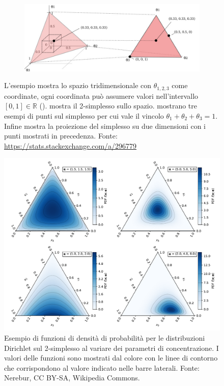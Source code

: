 \begin{figure}
    \begin{subfigure}{.9\textwidth}
        \centering
        \includegraphics[width=\linewidth]{assets/4/simplex_5.png}
        \caption{}
        \label{fig:4_simplex_5}
    \end{subfigure}

    \caption[Esempio di 2-simplesso]{L'esempio mostra lo spazio tridimensionale con $\theta_{1, 2, 3}$ come coordinate, ogni coordinata può assumere valori nell'intervallo $[0, 1] \in \mathbb{R}$ ().  mostra il 2-simplesso sullo spazio.  mostrano tre esempi di punti sul simplesso per cui vale il vincolo $\theta_1 + \theta_2 + \theta_3 = 1$. Infine  mostra la proiezione del simplesso su due dimensioni con i punti mostrati in precedenza. Fonte: \url{https://stats.stackexchange.com/a/296779}}
    \label{fig:4_simplex}
\end{figure}

\begin{figure}
    \centering
    \includegraphics[width=\linewidth]{assets/4/dirichlet_concentration.pdf}
    \caption[Esempio di variazione dei parametri di concentrazione per Dirichlet]{Esempio di funzioni di densità di probabilità per le distribuzioni Dirichlet sul 2-simplesso al variare dei parametri di concentrazione. I valori delle funzioni sono mostrati dal colore con le linee di contorno che corrispondono al valore indicato nelle barre laterali. Fonte: Nerebur, CC BY-SA, Wikipedia Commons.}
    \label{fig:4_dirichlet_concentration}
\end{figure}

